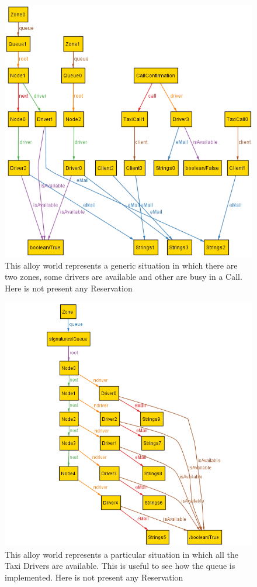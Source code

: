 \documentclass[a4paper]{article}
\begin{document}
\nopagebreak
\begin{figure}[H]
\includegraphics[width=\worldsWidth]{Alloy-Generic}
\centering
\caption[Alloy Generic World]{This alloy world represents a generic situation in which there are two zones, some drivers are available and other are busy in a Call. Here is not present any Reservation}
\label{fig:alloyworldgeneric}
\end{figure}

\begin{figure}[H]
\includegraphics[width=\worldsWidth]{Alloy-AllAvailable}
\centering
\caption[Alloy World with all the Taxi Drivers Available]{This alloy world represents a particular situation in which all the Taxi Drivers are available. This is useful to see how the queue is implemented. Here is not present any Reservation}
\label{fig:alloyworldallavailable}
\end{figure}
\end{document}
